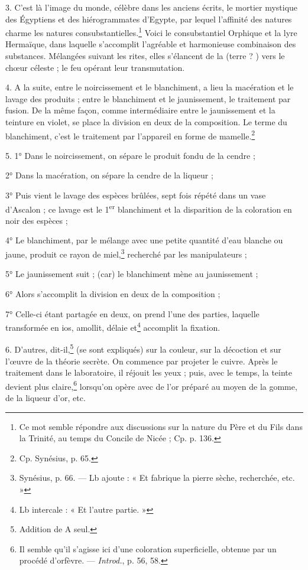 \documentclass[landscape, a4paper, 11pt, oneside, polutonikogreek, french]{article}
\begin{document}
3. C'est là l'image du monde, célèbre dans les anciens écrits, le mortier mystique des Égyptiens et des hiérogrammates d'Egypte, par lequel l'affinité des natures charme les natures consubstantielles.\footnote{Ce mot semble répondre aux discussions sur la nature du Père et du Fils dans la Trinité, au temps du Concile de Nicée ; Cp. p. 136.} Voici le consubstantiel Orphique et la lyre Hermaïque, dans laquelle s'accomplit l'agréable et harmonieuse combinaison des substances. Mélangées suivant les rites, elles s'élancent de la (terre ? ) vers le chœur céleste ; le feu opérant leur transmutation.

4. A la suite, entre le noircissement et le blanchiment, a lieu la macération et le lavage des produits ; entre le blanchiment et le jaunissement, le traitement par fusion. De la même façon, comme intermédiaire entre le jaunissement et la teinture en violet, se place la division en deux de la composition. Le terme du blanchiment, c'est le traitement par l'appareil en forme de mamelle.\footnote{Cp. Synésius, p. 65.}

5. 1° Dans le noircissement, on sépare le produit fondu de la cendre ;

2° Dans la macération, on sépare la cendre de la liqueur ;

3° Puis vient le lavage des espèces brûlées, sept fois répété dans un vase d'Ascalon ; ce lavage est le 1\textsuperscript{er} blanchiment et la disparition de la coloration en noir des espèces ;

4° Le blanchiment, par le mélange avec une petite quantité d'eau blanche ou jaune, produit ce rayon de miel,\footnote{Synésius, p. 66. --- Lb ajoute : « Et fabrique la pierre sèche, recherchée, etc. »} recherché par les manipulateurs ;

5° Le jaunissement suit ; (car) le blanchiment mène au jaunissement ;

6° Alors s'accomplit la division en deux de la composition ;

7° Celle-ci étant partagée en deux, on prend l'une des parties, laquelle transformée en ios, amollit, délaie et\footnote{Lb intercale : « Et l'autre partie. »} accomplit la fixation.

6. D'autres, dit-il,\footnote{Addition de A seul.} (se sont expliqués) sur la couleur, sur la décoction et sur l'œuvre de la théorie secrète. On commence par projeter le cuivre. Après le traitement dans le laboratoire, il réjouit les yeux ; puis, avec le temps, la teinte devient plus claire,\footnote{Il semble qu'il s'agisse ici d'une coloration superficielle, obtenue par un procédé d'orfèvre. --- \emph{Introd.}, p. 56, 58.} lorsqu'on opère avec de l'or préparé au moyen de la gomme, de la liqueur d'or, etc.
\end{document}
